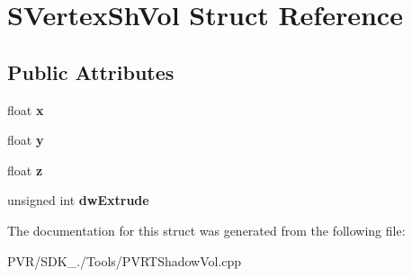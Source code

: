 \hypertarget{struct_s_vertex_sh_vol}{\section{S\+Vertex\+Sh\+Vol Struct Reference}
\label{struct_s_vertex_sh_vol}
}
\subsection*{Public Attributes}
\begin{DoxyCompactItemize}
\item 
\hypertarget{struct_s_vertex_sh_vol_a2653b82159b99de161dc80b910b8d950}{float {\bfseries x}}\label{struct_s_vertex_sh_vol_a2653b82159b99de161dc80b910b8d950}

\item 
\hypertarget{struct_s_vertex_sh_vol_a0f0bc8cbefbe6ec80655312962f862e2}{float {\bfseries y}}\label{struct_s_vertex_sh_vol_a0f0bc8cbefbe6ec80655312962f862e2}

\item 
\hypertarget{struct_s_vertex_sh_vol_a60c18f3921358506c29c68e352f489a4}{float {\bfseries z}}\label{struct_s_vertex_sh_vol_a60c18f3921358506c29c68e352f489a4}

\item 
\hypertarget{struct_s_vertex_sh_vol_a5491c8f169f2c09ba8dc48e113ea015c}{unsigned int {\bfseries dw\+Extrude}}\label{struct_s_vertex_sh_vol_a5491c8f169f2c09ba8dc48e113ea015c}

\end{DoxyCompactItemize}


The documentation for this struct was generated from the following file\+:\begin{DoxyCompactItemize}
\item 
P\+V\+R/\+S\+D\+K\+\_./\+Tools/P\+V\+R\+T\+Shadow\+Vol.\+cpp\end{DoxyCompactItemize}
